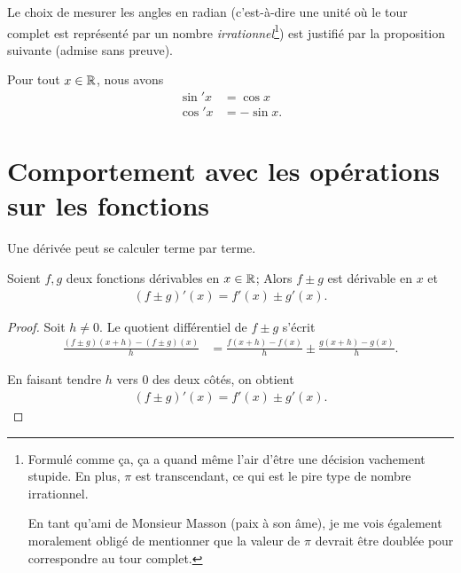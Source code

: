 \documentclass[main.tex]{subfiles}
\begin{document}
Le choix de mesurer les angles en radian
(c'est-à-dire une unité où le tour complet est représenté par un nombre \emph{irrationnel}\footnote{%
    Formulé comme ça, ça a quand même l'air d'être une décision vachement stupide.
    En plus, $\pi$ est transcendant, ce qui est le pire type de nombre irrationnel.

    En tant qu'ami de Monsieur Masson (paix à son âme),
    je me vois également moralement obligé de mentionner
    que la valeur de $\pi$ devrait être doublée pour correspondre au tour complet.
})
est justifié par la proposition suivante (admise sans preuve).

\begin{proposition}

    Pour tout $x \in \mathbb{R}$,
    nous avons
    \begin{align}
        \sin' x &= \cos x\\
        \cos' x &= -\sin x.
    \end{align}
\end{proposition}

\section{Comportement avec les opérations sur les fonctions}

Une dérivée peut se calculer terme par terme.

\begin{proposition}

    Soient $f, g$ deux fonctions dérivables en $x \in \mathbb{R}$;
    Alors $f \pm g$ est dérivable en $x$ et
    \begin{align}
        (f \pm g)'(x) = f'(x) \pm g'(x).
    \end{align}
\end{proposition}
\begin{proof}
    Soit $h \neq 0$.
    Le quotient différentiel de $f \pm g$ s'écrit
    \begin{align}
        \frac {(f \pm g)(x + h) - (f \pm g)(x)} h
        &= \frac {f(x + h) - f(x)} h \pm \frac {g(x + h) - g(x)} h.
    \end{align}

    En faisant tendre $h$ vers $0$ des deux côtés,
    on obtient
    \begin{align}
        (f \pm g)'(x) = f'(x) \pm g'(x).
    \end{align}
\end{proof}
\end{document}
